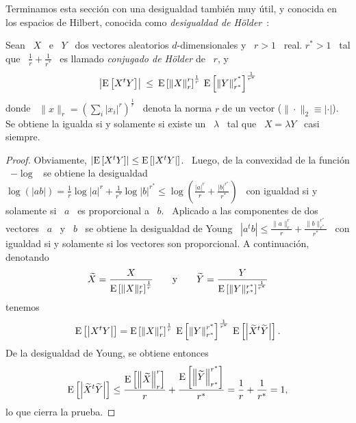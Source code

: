 Terminamos esta secci\'on  con una desigualdad tambi\'en muy  \'util, y conocida
en   los   espacios   de    Hilbert,   conocida   como   {\it   desigualdad   de
  H\"older}~\cite{Hol98}:
%
\begin{teorema}
\label{Teo:MP:Holder}
%
Sean \ $X$ \  e \ $Y$ \ dos vectores aleatorios $d$-dimensionales y  \ $r > 1$ \
real. $r^* > 1$ \ tal que  \ $\frac1r + \frac1{r^*}$ \ es llamado {\it conjugado
  de H\"older} de \ $r$, y
  \[
  \left|  \operatorname{E}\left[  X^t Y  \right]  \right| \:  \le  \:  \operatorname{E}\left[ \left\|  X
    \right\|_r^r   \right]^{\frac1r}  \:  \operatorname{E}\left[   \left\|  Y
    \right\|_{r^*}^{r^*} \right]^{\frac1{r^*}}
  \]
  donde \ $\|  x \|_r = \left( \sum_i \left|  x_i \right|^r \right)^{\frac1r}$ \
  denota la norma  $r$ de un vector ($\|\cdot\|_2  \equiv |\cdot|$).  Se obtiene
  la igualda si y solamente si existe un \ $\lambda$ \ tal que \ $X = \lambda Y$
  \ casi siempre.
\end{teorema}
%
\begin{proof}
  Obviamente, $\left| \operatorname{E}\left[ X^t Y \right] \right| \le \operatorname{E}\left[ \left| X^t
      Y \right| \right]$. \ Luego, de  la convexidad de la funci\'on \ $-\log$ \
  se obtiene  la desigualdad \ $\log(|a  b|) = \frac1r \log  |a|^r + \frac1{r^*}
  \log |b|^{r^*} \le \log\left( \frac{|a|^r}{r} + \frac{|b|^{r^*}}{r^*} \right)$
  \ con igualdad si y solamente si \ $a$ \ es proporcional a \ $b$. \ Aplicado a
  las componentes de dos vectores \ $a$ \ y \ $b$ \ se obtiene la desigualdad de
  Young    \    $\left|    a^t    b   \right|    \le    \frac{\|a\|_r^r}{r}    +
  \frac{\|b\|_{r^*}^{r^*}}{r^*}$ \  con igualdad si y solamente  si los vectores
  son proporcional. A continuaci\'on, denotando
  \[
  \widetilde{X}         =         \frac{X}{\operatorname{E}\left[        \|X\|_r^r
    \right]^{\frac1r}}    \qquad    \mbox{y}    \qquad   \widetilde{Y}    =
  \frac{Y}{\operatorname{E}\left[ \|Y\|_{r^*}^{r^*} \right]^{\frac1{r^*}}}
  \]
  tenemos
  \[
  \operatorname{E}\left[   \left|   X^t  Y   \right|   \right]   =   \operatorname{E}\left[  \left\|   X
    \right\|_r^r   \right]^{\frac1r}  \:  \operatorname{E}\left[   \left\|  Y
    \right\|_{r^*}^{r^*}   \right]^{\frac1{r^*}}   \:  \operatorname{E}\left[
    \left| \widetilde{X}^t \widetilde{Y} \right| \right].
  \]
  De la desigualdad de Young, se obtiene entonces
  \[
  \operatorname{E}\left[   \left|   \widetilde{X}^t   \widetilde{Y}  \right|   \right]   \le
  \frac{\operatorname{E}\left[ \left\| \widetilde{X} \right\|_r^r \right]}{r}
  +   \frac{\operatorname{E}\left[   \left\|  \widetilde{Y}   \right\|_{r^*}^{r^*}
    \right]}{r^*} = \frac1r + \frac1{r^*} = 1,
  \]
  lo que cierra la prueba.
\end{proof}

